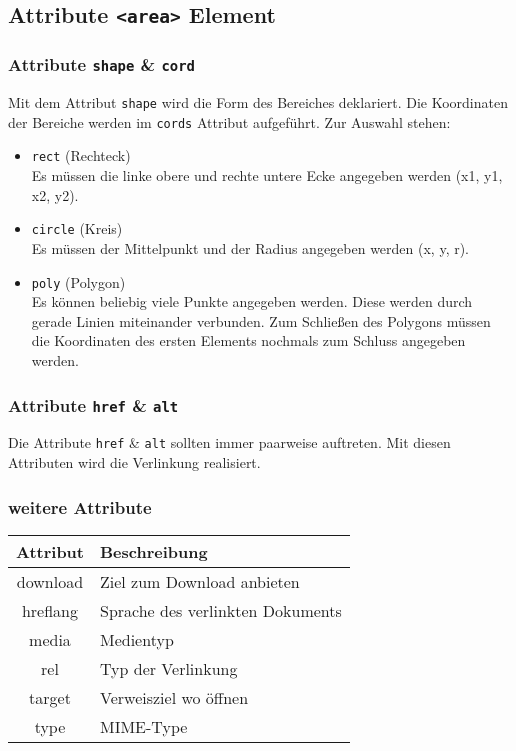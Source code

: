 \subsection{Attribute \texttt{<area>} Element}
\subsubsection{Attribute \texttt{shape} \& \texttt{cord}}
Mit dem Attribut \texttt{shape} wird die Form des Bereiches deklariert. Die Koordinaten der Bereiche werden im \texttt{cords} Attribut aufgeführt. Zur Auswahl stehen:
\begin{itemize}
\item \texttt{rect} (Rechteck)\\
Es müssen die linke obere und rechte untere Ecke angegeben werden (x1, y1, x2, y2).
\item \texttt{circle} (Kreis)\\
Es müssen der Mittelpunkt und der Radius angegeben werden (x, y, r).
\item \texttt{poly} (Polygon)\\
Es können beliebig viele Punkte angegeben werden. Diese werden durch gerade Linien miteinander verbunden. Zum Schließen des Polygons müssen die Koordinaten des ersten Elements nochmals zum Schluss angegeben werden.
\end{itemize}
\subsubsection{Attribute \texttt{href} \& \texttt{alt}}
Die Attribute \texttt{href} \& \texttt{alt} sollten immer paarweise auftreten. Mit diesen Attributen wird die Verlinkung realisiert.
\subsubsection{weitere Attribute}
\begin{tabular}{|c|l|}
\hline
\rowcolor{lstback}\textbf{Attribut}	&\textbf{Beschreibung}\\
\hline
download	&Ziel zum Download anbieten\\
\hline
hreflang	&Sprache des verlinkten Dokuments\\
\hline
media	&Medientyp\\
\hline
rel		&Typ der Verlinkung\\
\hline
target	&Verweisziel wo öffnen\\
\hline
type		&MIME-Type\\
\hline
\end{tabular}
